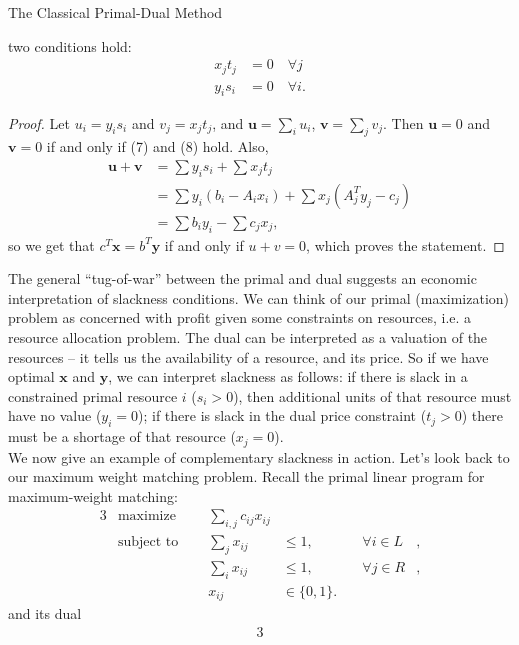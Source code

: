\documentclass[11pt]{article}
\renewcommand{\'}{^{'}}
\newenvironment{theorem}[2][Theorem]{\begin{trivlist}
\item[\hskip \labelsep {\bfseries #1}\hskip \labelsep {\bfseries #2.}]}{\end{trivlist}}
\begin{document}
\begin{section}{The Classical Primal-Dual Method}
\begin{theorem}{}
		two conditions hold:
		\begin{align}
			x_jt_j &= 0 \quad \forall j \\
			y_is_i &= 0 \quad \forall i.
		\end{align}
	\end{theorem}
	\begin{proof}
		Let $u_i = y_is_i$ and $v_j = x_jt_j$, and $\mathbf{u} = \sum_i u_i$, 
		$\mathbf{v} = \sum_j v_j$. Then $\mathbf{u} = 0$ and $\mathbf{v} = 0$ if and only if 
		(7) and (8) hold. Also, 
		\begin{align*}
			\mathbf{u} + \mathbf{v} &= \sum y_is_i + \sum x_jt_j \\
						&= \sum y_i(b_i - A_ix_i) + \sum x_j (A^{T}_jy_j-c_j)\\
						&= \sum b_iy_i - \sum c_jx_j,
		\end{align*}
		so we get that $c^{T}\mathbf{x} = b^{T}\mathbf{y}$ if and only if $u + v = 0$, which 
		proves the statement.
	\end{proof}
	The general ``tug-of-war'' between the primal and dual suggests an economic interpretation 
	of slackness conditions. We can think of our primal (maximization) problem as concerned with 
	profit given some constraints on resources, i.e. a resource allocation problem. The dual can 
	be interpreted as a valuation of the resources -- it tells us the availability of a resource, 
	and its price. So if we have optimal $\mathbf{x}$ and $\mathbf{y}$, we can interpret 
	slackness as follows: if there is slack in a constrained primal resource $i$ ($s_i > 0$), 
	then additional units of that resource must have no value ($y_i = 0$); if there is slack 
	in the dual price constraint ($t_j > 0$) there must be a shortage of that resource ($x_j = 0$).\\
	We now give an example of complementary slackness in action. Let's look back to our maximum 
	weight matching problem.
	Recall the primal linear program for maximum-weight matching:
	\begin{alignat}{3}
		& \text{maximize } & \sum_{i,j} c_{ij} x_{ij}& \\
		& \text{subject to } \quad & \sum_{j} x_{ij} & \leq 1, & \quad \forall i\in L&, \\
				     &\quad & \sum_{i} x_{ij} & \leq 1, & \quad \forall j\in R &, \\
				&& x_{ij} & \in \{0,1\}.
	\end{alignat}
	and its dual
	\begin{alignat}{3}

\end{alignat}
\end{section}
\end{document}
